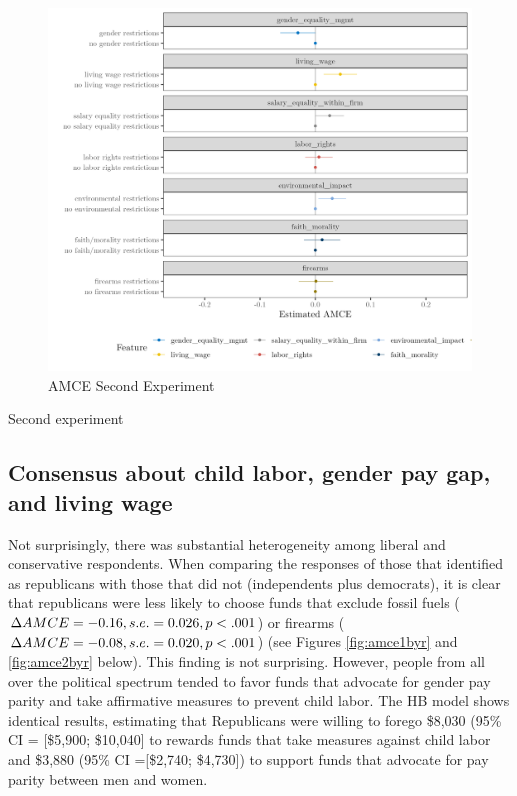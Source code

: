 \documentclass[
  12pt,
]{article}
\begin{document}
\begin{figure}

{\centering \includegraphics{amcecj2jmainb} 

}

\caption{AMCE Second Experiment}\label{fig:amce2cjmain}
\end{figure}

Second experiment

\hypertarget{consensus-about-child-labor-gender-pay-gap-and-living-wage}{%
\subsection{Consensus about child labor, gender pay gap, and living wage}\label{consensus-about-child-labor-gender-pay-gap-and-living-wage}}

Not surprisingly, there was substantial heterogeneity among liberal and conservative respondents. When comparing the responses of those that identified as republicans with those that did not (independents plus democrats), it is clear that republicans were less likely to choose funds that exclude fossil fuels (\(\Delta AMCE = -0.16, \space s.e. = 0.026, \space p <.001\)) or firearms (\(\Delta AMCE = -0.08, \space s.e. = 0.020, \space p<.001\)) (see Figures \ref{fig:amce1byr} and \ref{fig:amce2byr} below). This finding is not surprising. However, people from all over the political spectrum tended to favor funds that advocate for gender pay parity and take affirmative measures to prevent child labor. The HB model shows identical results, estimating that Republicans were willing to forego \$8,030 (95\% CI = {[}\$5,900; \$10,040{]} to rewards funds that take measures against child labor and \$3,880 (95\% CI ={[}\$2,740; \$4,730{]}) to support funds that advocate for pay parity between men and women.
\end{document}
